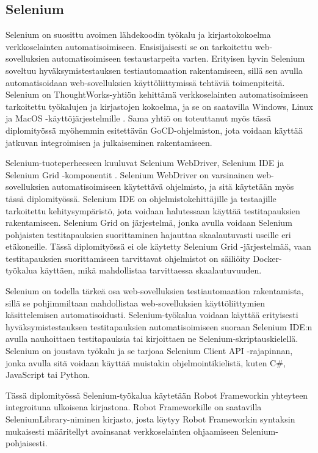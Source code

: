   \subsection{Selenium} \label{ch:08_selenium}

    Selenium on suosittu avoimen lähdekoodin työkalu ja kirjastokokoelma verkkoselainten automatisoimiseen.
    Ensisijaisesti se on tarkoitettu web-sovelluksien automatisoimiseen testaustarpeita varten.
    Erityisen hyvin Selenium soveltuu hyväksymistestauksen testiautomaation rakentamiseen, sillä sen avulla automatisoidaan web-sovelluksien käyttöliittymissä tehtäviä toimenpiteitä.
    Selenium on ThoughtWorks-yhtiön kehittämä verkkoselainten automatisoimiseen tarkoitettu työkalujen ja kirjastojen kokoelma, ja se on saatavilla Windows, Linux ja MacOS -käyttöjärjestelmille \parencite{selenium_info_1}.
    Sama yhtiö on toteuttanut myös tässä diplomityössä myöhemmin esitettävän GoCD-ohjelmiston, jota voidaan käyttää jatkuvan integroimisen ja julkaiseminen rakentamiseen.

    Selenium-tuoteperheeseen kuuluvat Selenium WebDriver, Selenium IDE ja Selenium Grid -komponentit \parencite{selenium_info_2}.
    Selenium WebDriver on varsinainen web-sovelluksien automatisoimiseen käytettävä ohjelmisto, ja sitä käytetään myös tässä diplomityössä.
    Selenium IDE on ohjelmistokehittäjille ja testaajille tarkoitettu kehitysympäristö, jota voidaan halutessaan käyttää testitapauksien rakentamiseen.
    Selenium Grid on järjestelmä, jonka avulla voidaan Selenium pohjaisten testitapauksien suorittaminen hajauttaa skaalautuvasti useille eri etäkoneille.
    Tässä diplomityössä ei ole käytetty Selenium Grid -järjestelmää, vaan testitapauksien suorittamiseen tarvittavat ohjelmistot on säiliöity Docker-työkalua käyttäen, mikä mahdollistaa tarvittaessa skaalautuvuuden.

    Selenium on todella tärkeä osa web-sovelluksien testiautomaation rakentamista, sillä se pohjimmiltaan mahdollistaa web-sovelluksien käyttöliittymien käsittelemisen automatisoidusti.
    Selenium-työkalua voidaan käyttää erityisesti hyväksymistestauksen testitapauksien automatisoimiseen suoraan Selenium IDE:n avulla nauhoittaen testitapauksia tai kirjoittaen ne Selenium-skriptauskielellä.
    Selenium on joustava työkalu ja se tarjoaa Selenium Client API -rajapinnan, jonka avulla sitä voidaan käyttää muistakin ohjelmointikielistä, kuten C\#, JavaScript tai Python.

    Tässä diplomityössä Selenium-työkalua käytetään Robot Frameworkin yhteyteen integroituna ulkoisena kirjastona.
    Robot Frameworkille on saatavilla SeleniumLibrary-niminen kirjasto, josta löytyy Robot Frameworkin syntaksin mukaisesti määritellyt avainsanat verkkoselainten ohjaamiseen Selenium-pohjaisesti.

